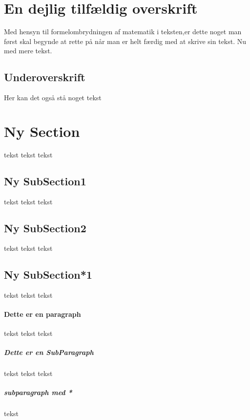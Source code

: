 

\section{En dejlig tilfældig overskrift}
Med hensyn til formelombrydningen af matematik i teksten,er dette noget man først skal begynde at rette på når man er helt færdig med at skrive sin tekst. Nu med mere tekst.
\subsection{Underoverskrift}
Her kan det også stå noget tekst
\section{Ny Section}
tekst tekst tekst
\subsection{Ny SubSection1}
tekst tekst tekst
\subsection{Ny SubSection2}
tekst tekst tekst
\subsection*{Ny SubSection*1}
tekst tekst tekst

\paragraph{Dette er en paragraph}
tekst tekst tekst
\subparagraph{Dette er en SubParagraph}
tekst tekst tekst
\subparagraph*{subparagraph med *}
tekst
 


